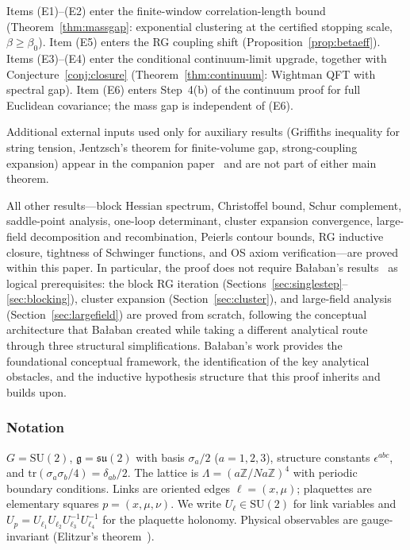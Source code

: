 \documentclass[11pt]{article}
\theoremstyle{definition}
\newcommand{\SU}{\mathrm{SU}}
\newcommand{\su}{\mathfrak{su}}
\newcommand{\tr}{\mathrm{tr}}
\newcommand{\Z}{\mathbb{Z}}
\begin{document}
\noindent Items (E1)--(E2) enter the finite-window correlation-length bound (Theorem~\ref{thm:massgap}: exponential clustering at the certified stopping scale, $\beta\ge\beta_0$).
Item (E5) enters the RG coupling shift
(Proposition~\ref{prop:betaeff}).
Items (E3)--(E4) enter the conditional continuum-limit upgrade, together with Conjecture~\ref{conj:closure} (Theorem~\ref{thm:continuum}: Wightman QFT with spectral gap).
Item (E6) enters Step~4(b) of the continuum proof for full
Euclidean covariance; the mass gap is independent of (E6).

\noindent Additional external inputs used only for
auxiliary results (Griffiths inequality for string tension,
Jentzsch's theorem for finite-volume gap, strong-coupling
expansion) appear in the companion paper~\cite{companion}
and are not part of either main theorem.

\noindent All other results---block Hessian spectrum, Christoffel
bound, Schur complement, saddle-point analysis, one-loop
determinant, cluster expansion convergence, large-field
decomposition and recombination, Peierls contour bounds, RG
inductive closure, tightness of Schwinger functions, and
OS axiom verification---are proved within this
paper.  In particular, the proof does not require Ba\l aban's
results~\cite{BalabanI,BalabanII,BalabanIII,BalabanLF1,BalabanLF2}
as logical prerequisites:
the block RG iteration (Sections~\ref{sec:singlestep}--\ref{sec:blocking}),
cluster expansion (Section~\ref{sec:cluster}), and large-field analysis
(Section~\ref{sec:largefield}) are proved from scratch, following
the conceptual architecture that Ba\l aban created while
taking a different analytical route through three structural
simplifications.  Ba\l aban's work provides the foundational
conceptual framework, the identification of the key analytical
obstacles, and the inductive hypothesis structure that
this proof inherits and builds upon.

\subsubsection*{Notation} $G=\SU(2)$, $\mathfrak{g}=\su(2)$ with basis
$\sigma_a/2$ ($a=1,2,3$), structure constants $\epsilon^{abc}$,
and $\tr(\sigma_a\sigma_b/4)=\delta_{ab}/2$.  The lattice is
$\Lambda=(a\Z/Na\Z)^4$ with periodic boundary conditions.  Links are
oriented edges $\ell=(x,\mu)$; plaquettes are elementary squares
$p=(x,\mu,\nu)$.  We write $U_\ell\in\SU(2)$ for link variables and
$U_p=U_{\ell_1}U_{\ell_2}U_{\ell_3}^{-1}U_{\ell_4}^{-1}$ for the
plaquette holonomy.  Physical observables are gauge-invariant
(Elitzur's theorem~\cite{Elitzur75}).
\end{document}
